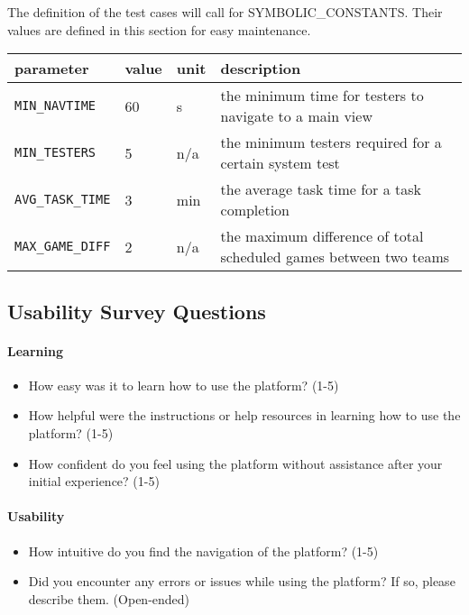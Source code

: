 \documentclass[12pt, titlepage]{article}
\begin{document}
The definition of the test cases will call for SYMBOLIC\_CONSTANTS.
Their values are defined in this section for easy maintenance.
\begin{longtable}{|l|l|l|p{5cm}|}

\hline
parameter & value & unit & description\\
\hline
\texttt{MIN\_NAVTIME}\label{MIN_NAVTIME} & 60 & s & the minimum time for testers to navigate to a main view \\
\hline
\texttt{MIN\_TESTERS}\label{MIN_TESTERS} & 5 & n/a & the minimum testers required for a certain system test \\
\hline
\texttt{AVG\_TASK\_TIME}\label{AVG_TASK_TIME} & 3 & min & the average task time for a task completion \\
\hline
\texttt{MAX\_GAME\_DIFF}\label{MAX_GAME_DIFF} & 2 & n/a & the maximum difference of total scheduled games between two teams \\
\hline
\end{longtable}

\subsection{Usability Survey Questions}

\paragraph{Learning}
\begin{itemize}
\item{How easy was it to learn how to use the platform? (1-5)}
\item{How helpful were the instructions or help resources in learning how to use the platform? (1-5)}
\item{How confident do you feel using the platform without assistance after your initial experience? (1-5)}
\end{itemize}

\paragraph{Usability}
\begin{itemize}
\item{How intuitive do you find the navigation of the platform? (1-5)}
\item{Did you encounter any errors or issues while using the platform? If so, please describe them. (Open-ended)}
\end{itemize}
\end{document}
